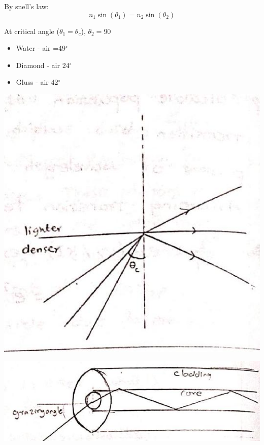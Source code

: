 \documentclass[12pt, a4paper]{article}
\begin{document}
\begin{minipage}[t][][b]{.57\textwidth}%
	By snell's law:
	$$
		n_{1} \sin \left(\theta_{1}\right)=n_{2} \sin \left(\theta_{2}\right)
	$$

	At critical angle ($\theta_1 = \theta_c$), $\theta_{2}=90$
	\vspace{-.5cm}

	\begin{itemize}
		\item Water - air =49$^{\circ}$
		\item Diamond - air 24$^{\circ}$
		\item Gluss - air 42$^{\circ}$
	\end{itemize}
\end{minipage}%
\begin{minipage}[t][][b]{.4\textwidth}%
	\includegraphics[max width=\textwidth]{2024_06_16_30d750483617f1939202g-05(3)}

	\includegraphics[max width=\textwidth]{2024_06_16_30d750483617f1939202g-05}
\end{minipage}
\end{document}

